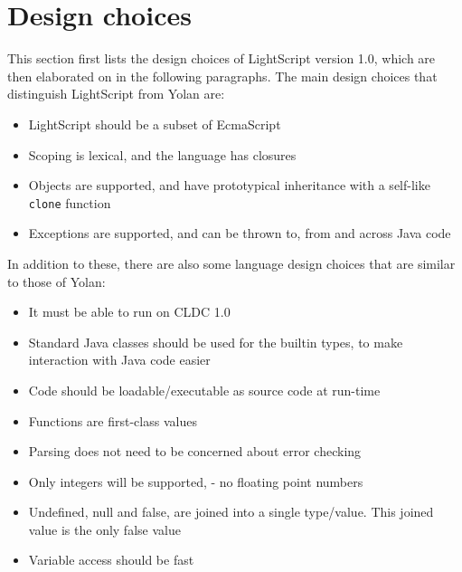 \documentclass[11pt]{report}
\begin{document}
\section{Design choices}
\label{lightscript-design}
This section first lists the design choices of LightScript version 1.0, which are then elaborated on in the following paragraphs.
The main design choices that distinguish LightScript from Yolan are:
\begin{itemize}
\item LightScript should be a subset of EcmaScript
\item Scoping is lexical, and the language has closures
\item Objects are supported, and have prototypical inheritance with a self-like \verb|clone| function
\item Exceptions are supported, and can be thrown to, from and across Java code
\end{itemize}
In addition to these, there are also some language design choices that are similar to those of Yolan:
\begin{itemize}
\item It must be able to run on CLDC 1.0
\item Standard Java classes should be used for the builtin types, to make interaction with Java code easier
\item Code should be loadable/executable as source code at run-time
\item Functions are first-class values
\item Parsing does not need to be concerned about error checking
\item Only integers will be supported, - no floating point numbers
\item Undefined, null and false, are joined into a single type/value. This joined value is the only false value
\item Variable access should be fast
\end{itemize}
\end{document}
